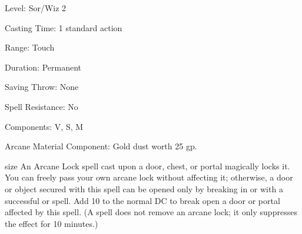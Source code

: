 
\begin{description*}
\item[Level:] Sor/Wiz 2
\item[Casting Time:] 1 standard action
\item[Range:] Touch
\item[Duration:] Permanent
\item[Saving Throw:] None
\item[Spell Resistance:] No
\item[Components:] V, S, M
\item[Arcane Material Component:] Gold dust worth 25 gp.
\end{description*}

size
An Arcane Lock spell cast upon a door, chest, or portal magically locks
it. You can freely pass your own arcane lock without affecting it; otherwise,
a door or object secured with this spell can be opened only by breaking in or with
a successful  or  spell. Add 10 to the normal
DC to break open a door or portal affected by this spell. (A  spell
does not remove an arcane lock; it only suppresses the effect for 10 minutes.)